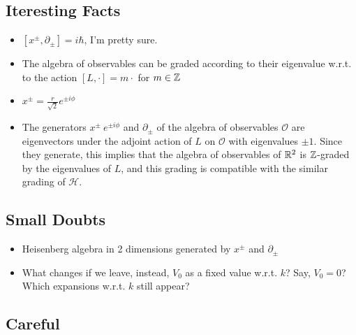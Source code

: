 \documentclass{article}
\begin{document}
\subsection*{Iteresting Facts}

    \begin{itemize}

    \item $[x^\pm, \partial_\pm] = i \hbar$, I'm pretty sure.
    
    \item The algebra of observables can be graded according to their eigenvalue w.r.t. to the action $[L, \cdot] = m \cdot$ for $m \in \mathbb{Z}$
    
    \item $x^\pm = \frac{r}{\sqrt{2}} e^{\pm i \phi}$
    
    \item The generators $x^\pm ~ e^{\pm i \phi}$ and $\partial_\pm$ of the algebra of observables $\mathcal O$ are eigenvectors under the adjoint action of $L$ on $\mathcal O$ with eigenvalues $\pm 1$. Since they generate, this implies that the algebra of observables of $\mathbb{R}^2$ is $\mathbb{Z}$-graded by the eigenvalues of $L$, and this grading is compatible with the similar grading of $\mathcal H$.
    
    \end{itemize}

\subsection*{Small Doubts}

    \begin{itemize}

    \item Heisenberg algebra in 2 dimensions generated by $x^\pm$ and $\partial_\pm$
    
    \item What changes if we leave, instead, $V_0$ as a fixed value w.r.t. $k$? Say, $V_0 = 0$? Which expansions w.r.t. $k$ still appear?
    
    \end{itemize}

\subsection*{Careful}
\end{document}
